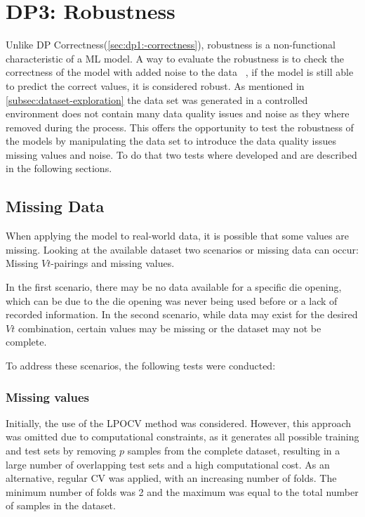 \section{DP3: Robustness}\label{sec:robustness}

Unlike \ac{DP} Correctness(\cref{sec:dp1:-correctness}), robustness is a non-functional characteristic of a \ac{ML}
model.
A way to evaluate the robustness is to check the correctness of the model with added noise to the
data
~\cite[p. 1]{saez_evaluatingclassifierbehavior_2016}, if the model is still able to predict the correct values, it is
considered robust.
As mentioned in \cref{subsec:dataset-exploration} the data set was generated in a controlled environment does not
contain many data quality issues and noise as they where removed during the process.
This offers the opportunity to test the robustness of the models by manipulating the data set to introduce the data
quality issues missing values and noise.
To do that two tests where developed and are described in the following sections.

\subsection{Missing Data}\label{subsec:missing-data}
When applying the model to real-world data, it is possible that some values are missing.
Looking at the available dataset two scenarios or missing data can occur:
Missing $Vt$-pairings and missing values.

In the first scenario, there may be no data available for a specific die opening, which can be due to the die opening
was never being used before or a lack of recorded information.
In the second scenario, while data may exist for the desired $Vt$ combination, certain values may
be missing or the dataset may not be complete.

To address these scenarios, the following tests were conducted:

\subsubsection{Missing values}

Initially, the use of the \ac{LPOCV} method was considered.
However, this approach was omitted due to computational constraints, as it generates all possible
training and test sets by removing $p$ samples from the complete dataset, resulting in a large
number of overlapping test sets and a high computational cost.
As an alternative, regular \ac{CV} was applied, with an increasing number of folds.
The minimum number of folds was 2 and the maximum was equal to the total number of samples in the
dataset.

